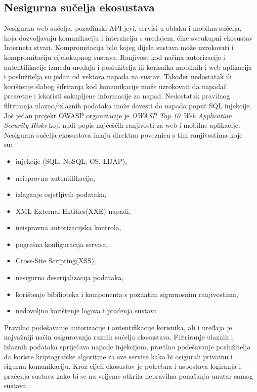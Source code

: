 \documentclass[times, utf8, diplomski]{fer}
\begin{document}
\subsection{Nesigurna sučelja ekosustava}
Nesigurna web sučelja, pozadinski API-jevi, servisi u oblaku i mobilna sučelja, koja dozvoljavaju komunikaciju i interakciju s uređajem, čine sveukupni ekosustav Interneta stvari. Kompromitacija bilo kojeg dijela sustava može uzrokovati i kompromitaciju cijelokupnog sustava. Ranjivost kod načina autorizacije i autentifikacije između uređaja i poslužitelja ili korisnika mobilnih i web aplikacija i poslužitelja su jedan od vektora napada na sustav. Također nedostatak ili korištenje slabog šifriranja kod komunikacije može uzrokovati da napadač presretne i iskoristi sakupljene informacije za napad. Nedostatak pravilnog filtriranja ulazno/izlaznih podataka može dovesti do napada poput SQL injekcije. Još jedan projekt OWASP organizacije je \emph{OWASP Top 10 Web Application Security Risks} koji nudi popis najčešćih ranjivosti za web i mobilne aplikacije. Nesigurna sučelja ekosustava imaju direktnu poveznicu s tim ranjivostima koje su: \begin{itemize}
    \item injekcije (SQL, NoSQL, OS, LDAP),
    \item neispravna autentifikacija,
    \item izlaganje osjetljivih podataka,
    \item XML External Entities(XXE) napadi,
    \item neispravna autorizacijska kontrola,
    \item pogrešna konfiguracija servisa,
    \item Cross-Site Scripting(XSS),
    \item nesigurna deserijalizacija podataka,
    \item korištenje bibilioteka i komponenta s poznatim sigurnosnim ranjivostima,
    \item nedovoljno korištenje logova i praćenja sustava.\citep{owasp2}
\end{itemize}

Pravilno podešavanje autorizacije i autentifikacije korisnika, ali i uređaja je najvažniji način osiguravanja raznih sučelja ekosustava. Filtriranje ulaznih i izlaznih podataka spriječava napade injekcijom, pravilno podešavanje poslužitelja da koriste kriptografske algoritme za sve servise kako bi osigurali privatnu i sigurnu komunikaciju. Kroz cijeli ekosustav je potrebna i uspostava logiranja i praćenja sustava kako bi se na vrijeme otkrila nepravilna ponašanja unutar samog sustava.
\end{document}

